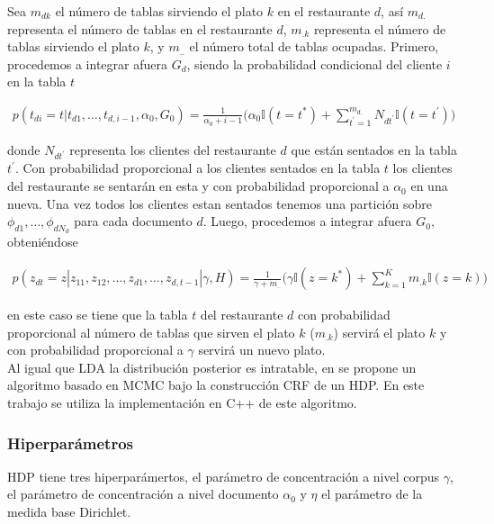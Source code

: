 \documentclass[letterpaper,12pt,oneside]{book} %
\begin{document}
Sea $m_{dk}$ el número de tablas sirviendo el plato $k$ en el restaurante $d$, así $m_{d.}$ representa el número de tablas en el restaurante $d$, $m_{.k}$ representa el número de tablas sirviendo el plato $k$, y $m_{..}$ el número total de tablas ocupadas. Primero, procedemos a integrar afuera $G_{d}$, siendo la probabilidad condicional del cliente $i$ en la tabla $t$

\begin{align}
p(t_{di}=t|t_{d1}, \ldots, t_{d,i-1}, \alpha_{0}, G_{0}) = \frac{1}{\alpha_{0}+i-1}\bigg(\alpha_{0}\mathbb{I}(t=t^{*})+\sum_{t^{'}=1}^{m_{d.}}N_{dt^{'}}\mathbb{I}(t=t^{'})\bigg)
\end{align}

donde $N_{dt^{'}}$ representa los clientes del restaurante $d$ que están sentados en la tabla $t^{'}$. Con probabilidad proporcional a los clientes sentados en la tabla $t$ los clientes del restaurante se sentarán en esta y con probabilidad proporcional a $\alpha_{0}$ en una nueva. Una vez todos los clientes estan sentados tenemos una partición sobre $\phi_{d1}, \ldots, \phi_{dN_{d}}$ para cada documento $d$. Luego, procedemos a integrar afuera $G_{0}$, obteniéndose

\begin{align}
    p(z_{dt}=z|z_{11}, z_{12}, \ldots, z_{d1}, \ldots, z_{d, t-1}|\gamma, H) = \frac{1}{\gamma+m_{..}}\bigg(\gamma\mathbb{I}(z=k^{*})+\sum_{k=1}^{K}m_{.k}\mathbb{I}(z=k)\bigg)
\end{align}

en este caso se tiene que la tabla $t$ del restaurante $d$ con probabilidad proporcional al número de tablas que sirven el plato $k$ ($m_{.k}$) servirá el plato $k$ y con probabilidad proporcional a $\gamma$ servirá un nuevo plato.\\
Al igual que LDA la distribución posterior es intratable, en  \citep{teh2005sharing} se propone un algoritmo basado en MCMC bajo la construcción CRF de un HDP. En este trabajo se utiliza la implementación en C++ \citep{HDP} de este algoritmo.

\subsubsection{Hiperparámetros}
HDP tiene tres hiperparámertos, el parámetro de concentración a nivel corpus $\gamma$, el parámetro de concentración a nivel documento $\alpha_{0}$ y $\eta$ el parámetro de la medida base Dirichlet.\\
\end{document}
